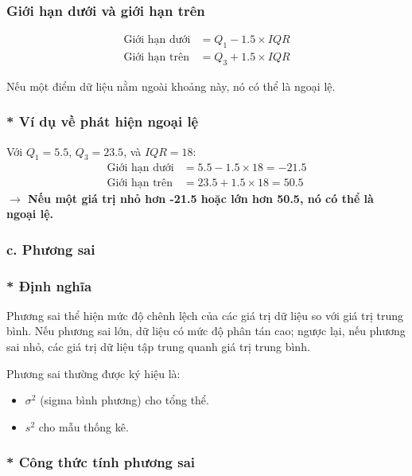 \subsubsection{Giới hạn dưới và giới hạn trên}
\begin{align}
    \text{Giới hạn dưới} &= Q_1 - 1.5 \times IQR \\
    \text{Giới hạn trên} &= Q_3 + 1.5 \times IQR
\end{align}

Nếu một điểm dữ liệu nằm ngoài khoảng này, nó có thể là ngoại lệ.

\subsubsection*{* Ví dụ về phát hiện ngoại lệ}
Với $Q_1 = 5.5$, $Q_3 = 23.5$, và $IQR = 18$:
\begin{align*}
    \text{Giới hạn dưới} &= 5.5 - 1.5 \times 18 = -21.5\\
    \text{Giới hạn trên} &= 23.5 + 1.5 \times 18 = 50.5
\end{align*}
\textbf{$\rightarrow$ Nếu một giá trị nhỏ hơn -21.5 hoặc lớn hơn 50.5, nó có thể là ngoại lệ.}

\subsubsection{c. Phương sai }
\subsubsection{* Định nghĩa }
Phương sai thể hiện mức độ chênh lệch của các giá trị dữ liệu so với giá trị trung bình. Nếu phương sai lớn, dữ liệu có mức độ phân tán cao; ngược lại, nếu phương sai nhỏ, các giá trị dữ liệu tập trung quanh giá trị trung bình.

Phương sai thường được ký hiệu là:
\begin{itemize}
    \item $\sigma^2$ (sigma bình phương) cho tổng thể.
    \item $s^2$ cho mẫu thống kê.
\end{itemize}

\subsubsection{* Công thức tính phương sai}
